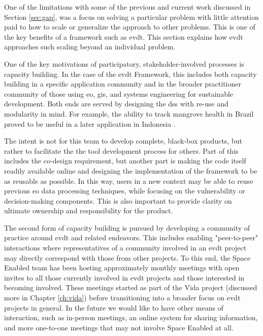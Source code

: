 One of the limitations with some of the previous and current work discussed in Section \ref{sec:gap}, was a focus on solving a particular problem with little attention paid to how to scale or generalize the approach to other problems. This is one of the key benefits of a framework such as \ac{evdt}. This section explains how \ac{evdt} approaches such scaling beyond an individual problem.

One of the key motivations of participatory, stakeholder-involved processes is capacity building. In the case of the \ac{evdt} Framework, this includes both capacity building in a specific application community and in the broader practitioner community of those using \ac{eo}, \ac{gis}, and systems engineering for sustainable development. Both ends are served by designing the \ac{dss} with re-use and modularity in mind. For example, the ability to track mangrove health in Brazil \cite{reidInteractiveModelAssessing2020} proved to be useful in a later application in Indonesia \cite{lombardoEnvironmentVulnerabilityDecisionTechnologyFrameworkDecision2022}. 

The intent is not for this team to develop complete, black-box products, but rather to facilitate the the tool development process for others. Part of this includes the co-design requirement, but another part is making the code itself readily available online and designing the implementation of the framework to be as reusable as possible. In this way, users in a new context may be able to reuse previous \ac{eo} data processing techniques, while focusing on the vulnerability or decision-making components. This is also important to provide clarity on ultimate ownership and responsibility for the product.

The second form of capacity building is pursued by developing a community of practice around \ac{evdt} and related endeavors. This includes enabling "peer-to-peer" interactions where representatives of a community involved in an \ac{evdt} project may directly correspond with those from other projects. To this end, the Space Enabled team has been hosting approximately monthly meetings with open invites to all those currently involved in \ac{evdt} projects and those interested in becoming involved. These meetings started as part of the Vida project (discussed more in Chapter \ref{ch:vida}) before transitioning into a broader focus on \ac{evdt} projects in general. In the future we would like to have other means of interaction, such as in-person meetings, an online system for sharing information, and more one-to-one meetings that may not involve Space Enabled at all.

